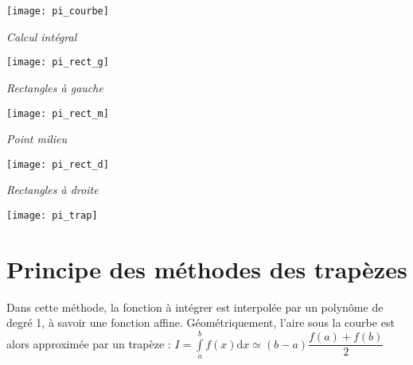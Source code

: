 \begin{figure*}[!h]
\begin{minipage}[c]{.24\linewidth}
\begin{center}
\texttt{[image: pi\_courbe]}

\textit{Calcul intégral}
\end{center}
\end{minipage}\hfill
\begin{minipage}[c]{.24\linewidth}
\begin{center}
\texttt{[image: pi\_rect\_g]}

\textit{Rectangles à gauche}
\end{center}
\end{minipage}\hfill
\begin{minipage}[c]{.24\linewidth}
\begin{center}
\texttt{[image: pi\_rect\_m]}

\textit{Point milieu}
\end{center}
\end{minipage}\hfill
\begin{minipage}[c]{.24\linewidth}
\begin{center}
\texttt{[image: pi\_rect\_d]}

\textit{Rectangles à droite}
\end{center}
\end{minipage}
\end{figure*}

\begin{marginfigure}
\texttt{[image: pi\_trap]}
\end{marginfigure}

\section{Principe des méthodes des trapèzes}


\begin{defi}
Dans cette méthode, la fonction à intégrer est interpolée par un polynôme de degré 1, à savoir une fonction affine. Géométriquement, l'aire sous la courbe est alors approximée par un trapèze :
$I = \int\limits_a^{b} f(x) \mathrm{d}x \simeq \left(b-a\right) \dfrac{f(a)+f(b)}{2} $
\end{defi}


